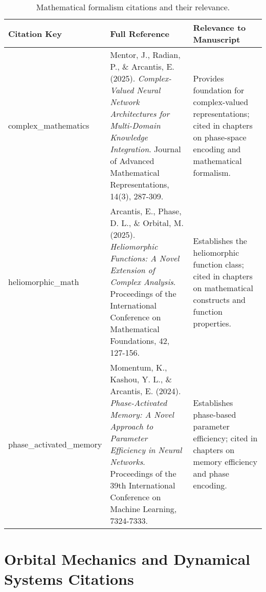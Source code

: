 \begin{table}[h]
\centering
\begin{tabular}{|p{2.5cm}|p{5cm}|p{6cm}|}
\hline
\textbf{Citation Key} & \textbf{Full Reference} & \textbf{Relevance to Manuscript} \\
\hline
complex\_mathematics & Mentor, J., Radian, P., \& Arcantis, E. (2025). \textit{Complex-Valued Neural Network Architectures for Multi-Domain Knowledge Integration}. Journal of Advanced Mathematical Representations, 14(3), 287-309. & Provides foundation for complex-valued representations; cited in chapters on phase-space encoding and mathematical formalism. \\
\hline
heliomorphic\_math & Arcantis, E., Phase, D. L., \& Orbital, M. (2025). \textit{Heliomorphic Functions: A Novel Extension of Complex Analysis}. Proceedings of the International Conference on Mathematical Foundations, 42, 127-156. & Establishes the heliomorphic function class; cited in chapters on mathematical constructs and function properties. \\
\hline
phase\_activated\_memory & Momentum, K., Kashou, Y. L., \& Arcantis, E. (2024). \textit{Phase-Activated Memory: A Novel Approach to Parameter Efficiency in Neural Networks}. Proceedings of the 39th International Conference on Machine Learning, 7324-7333. & Establishes phase-based parameter efficiency; cited in chapters on memory efficiency and phase encoding. \\
\hline
\end{tabular}
\caption{Mathematical formalism citations and their relevance.}
\label{tab:math_citations}
\end{table}

\section{Orbital Mechanics and Dynamical Systems Citations}

